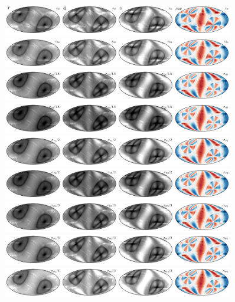 \documentclass[twocolumn]{../../common/aa}
\begin{document}
\begin{figure}[p]
	\centering
	\includegraphics[width=0.9\textwidth]{figures/023-WMAP_K_rms.pdf}
	\includegraphics[width=0.9\textwidth]{figures/030-WMAP_Ka_rms.pdf}
	\includegraphics[width=0.9\textwidth]{figures/040-WMAP_Q1_rms.pdf}
	\includegraphics[width=0.9\textwidth]{figures/040-WMAP_Q2_rms.pdf}
	\includegraphics[width=0.9\textwidth]{figures/060-WMAP_V1_rms.pdf}
	\includegraphics[width=0.9\textwidth]{figures/060-WMAP_V2_rms.pdf}
	\includegraphics[width=0.9\textwidth]{figures/090-WMAP_W1_rms.pdf}
	\includegraphics[width=0.9\textwidth]{figures/090-WMAP_W2_rms.pdf}
	\includegraphics[width=0.9\textwidth]{figures/090-WMAP_W3_rms.pdf}

\end{figure}
\end{document}
